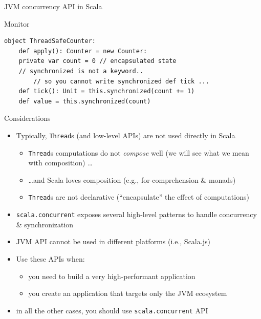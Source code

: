 \documentclass[presentation, 9pt]{beamer}\mode<presentation>{\usetheme{AMSBolognaFC}}
\begin{document}
\begin{frame}{JVM concurrency API in Scala}
\begin{itemize}
\begin{alertblock}{Monitor}
\begin{itemize}
\begin{tcolorbox}[left=0pt, top=0pt, bottom=0pt]
\begin{verbatim}
object ThreadSafeCounter:
	def apply(): Counter = new Counter:
    private var count = 0 // encapsulated state
    // synchronized is not a keyword.. 
		// so you cannot write synchronized def tick ...
    def tick(): Unit = this.synchronized(count += 1)
    def value = this.synchronized(count)
					\end{verbatim}
				\end{tcolorbox}
			\end{itemize}
		\end{alertblock}
	\end{itemize}
\end{frame}
\begin{frame}{Considerations}
	\begin{itemize}
		\item Typically, \texttt{Thread}s (and low-level APIs) are not used directly in Scala
  	\begin{itemize}
			\item \texttt{Thread}s computations do not \emph{compose} well (we will see what we mean with composition) \dots
   		\item \dots and Scala loves composition (e.g., for-comprehension \& monads)
     \item \texttt{Thread}s are not declarative (``encapsulate'' the effect of computations)
		\end{itemize}
 		\item \texttt{scala.concurrent} exposes several high-level patterns to handle concurrency \& synchronization
 		\item JVM API cannot be used in different platforms (i.e., Scala.js)
   	\item Use these APIs when:
    \begin{itemize}
			\item you need to build a very high-performant application
   		\item you create an application that targets only the JVM ecosystem 
		\end{itemize}
		\item in all the other cases, you should use \texttt{scala.concurrent} API
  \end{itemize}
\end{frame}
\end{document}
